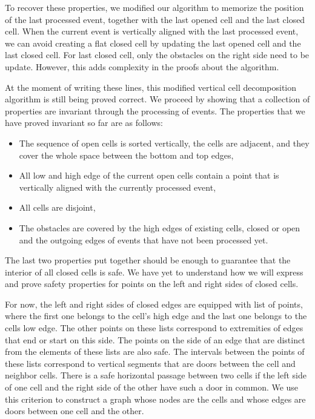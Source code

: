 \documentclass{easychair}
\begin{document}
To recover these properties, we modified our algorithm to memorize the
position of the last processed event, together with the last opened
cell and the last closed cell.  When the current event is vertically
aligned with the last processed event, we can avoid creating a flat
closed cell by updating the last opened cell and the last closed
cell.  For last closed cell, only the obstacles on the right side need
to be update.  However, this adds complexity in the proofs about the
algorithm.

At the moment of writing these lines, this modified vertical cell
decomposition algorithm is still being proved correct.  We proceed by
showing that a collection of properties are invariant through the
processing of events.  The properties that we have proved invariant so
far are as follows:
\begin{itemize}
\item The sequence of open cells is sorted vertically, the cells are
  adjacent, and they cover the whole space between the bottom and top
  edges,
\item All low and high edge of the current open cells contain a point
that is vertically aligned with the currently processed event,
\item All cells are disjoint,
\item The obstacles are covered by the high edges of existing cells,
  closed or open and the outgoing edges of events that have not been
  processed yet.
\end{itemize}
The last two properties put together should be enough to guarantee
that the interior of all closed cells is safe.  We have yet to
understand how we will express and prove safety properties for points
on the left and right sides of closed cells.

For now, the left and right sides of closed edges are equipped with
list of points, where the first one belongs to the cell's high edge
and the last one belongs to the cells low edge.  The other points on
these lists correspond to extremities of edges that end or start on
this side.  The points on the side of an edge that are distinct from
the elements of these lists are also safe.  The intervals between the
points of these lists correspond to vertical segments that are doors
between the cell and neighbor cells.  There is a safe horizontal
passage between two cells if the left side of one cell and the right
side of the other have such a door in common.  We use this criterion
to construct a graph whose nodes are the cells and whose edges are
doors between one cell and the other.
\end{document}
